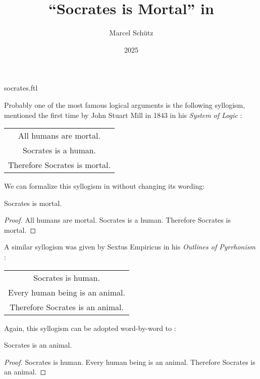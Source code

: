 \documentclass{stex}
\title{``Socrates is Mortal'' in \Naproche}
\author{Marcel Schütz}
\date{2025}
\begin{document}
\begin{smodule}{socrates.ftl}
\maketitle



\noindent Probably one of the most famous logical arguments is the following
syllogism, mentioned the first time by John Stuart Mill in 1843
\cite{Wheeler2023} in his \textit{System of Logic}
\cite[Book II, Chapter 3]{Mill1843}:
\begin{center}
  \begin{tabular}{c}
    All humans are mortal. \\
    Socrates is a human. \\
    \hline
    Therefore Socrates is mortal.
  \end{tabular}
\end{center}
We can formalize this syllogism in \Naproche without changing its wording:

\begin{forthel}
  \begin{theorem}[title=Mill's Syllogism,name=Mill Syllogism]
    Socrates is mortal.
  \end{theorem}
  \begin{proof}
    All humans are mortal.
    Socrates is a human.
    Therefore Socrates is mortal.
  \end{proof}
\end{forthel}

A similar syllogism was given by Sextus Empiricus in his \textit{Outlines of
Pyrrhonism} \cite{SextusEmpiricus1933}:
\begin{center}
  \begin{tabular}{c}
    Socrates is human. \\
    Every human being is an animal. \\
    \hline
    Therefore Socrates is an animal.
  \end{tabular}
\end{center}
Again, this syllogism can be adopted word-by-word to \Naproche:

\begin{forthel}
  \begin{theorem}[title=Sextus Empiricus' Syllogism,name=Sextus Empiricus Syllogism]
    Socrates is an animal.
  \end{theorem}
  \begin{proof}
    Socrates is human.
    Every human being is an animal.
    Therefore Socrates is an animal.
  \end{proof}
\end{forthel}

\printbibliography
{}

\end{smodule}
\end{document}
